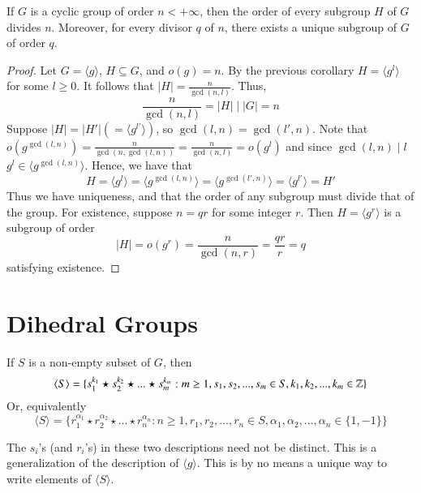 \begin{theorem}
        If $G$ is a cyclic group of order $n < +\infty$, then the order of every subgroup $H$ of $G$ divides $n$. Moreover, for every divisor $q$ of $n$, there exists a unique subgroup of $G$ of order $q$.
\end{theorem}
\begin{proof}
        Let $G = \langle g \rangle$, $H \subseteq G$, and $o(g) = n$. By the previous corollary $H = \langle g^l \rangle$ for some $l \geq 0$. It follows that $|H| = \frac{n}{\gcd(n,l)}$. Thus, $$\frac{n}{\gcd(n,l)} = |H|\;\vert\;|G| = n$$ Suppose $|H| = |H'| (=\langle g^{l'}\rangle)$, so $\gcd(l,n) = \gcd(l',n)$. Note that $o(g^{\gcd(l,n)}) = \frac{n}{\gcd(n,\gcd(l,n))} = \frac{n}{\gcd(n,l)} = o(g^l)$ and since $\gcd(l,n)\;\vert\;l$ $g^l \in \langle g^{\gcd(l,n)}\rangle$. Hence, we have that \begin{equation}
                H = \langle g^l \rangle = \langle g^{\gcd(l,n)} \rangle = \langle g^{\gcd(l',n)} \rangle = \langle g^{l'} \rangle = H'
        \end{equation}
        Thus we have uniqueness, and that the order of any subgroup must divide that of the group. For existence, suppose $n = qr$ for some integer $r$. Then $H = \langle g^r\rangle$ is a subgroup of order $$|H| = o(g^r) = \frac{n}{\gcd(n,r)} = \frac{qr}{r} = q$$ satisfying existence.
\end{proof}



\section{ Dihedral Groups}

\begin{claim}
    If $S$ is a non-empty subset of $G$, then \begin{equation}
        \langle S\rangle = \{s_1^{k_1}\star s_2^{k_2} \star ... \star s_m^{k_m}: m\geq 1, s_1,s_2,...,s_m \in S,k_1,k_2,...,k_m\in\mathbb Z\}
    \end{equation}
    Or, equivalently \begin{equation}
        \langle S\rangle = \{r_1^{\alpha_1}\star r_2^{\alpha_2} \star ... \star r_n^{\alpha_n}: n\geq 1, r_1,r_2,...,r_n \in S,\alpha_1,\alpha_2,...,\alpha_n\in\{1,-1\}\}
    \end{equation}
\end{claim}

\begin{remark}
    The $s_i$'s (and $r_i$'s) in these two descriptions need not be distinct. This is a generalization of the description of $\langle g \rangle$. This is by no means a unique way to write elements of $\langle S\rangle$.
\end{remark}

